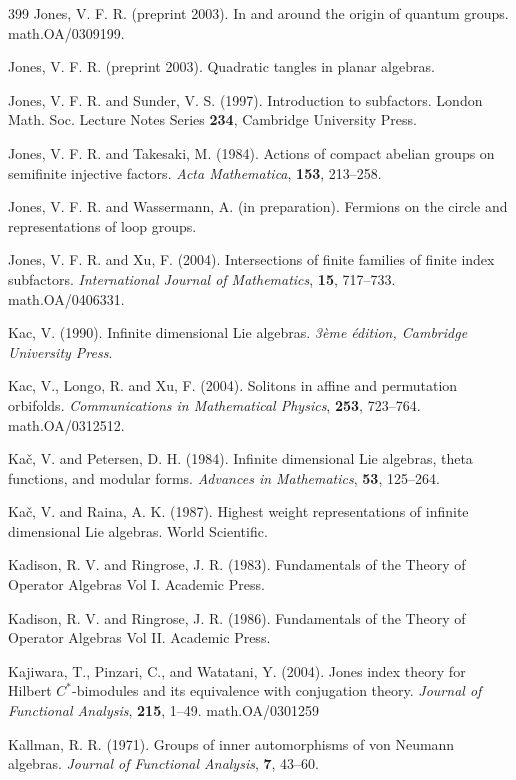 \documentclass[12pt]{article}
\theoremstyle{plain}
\theoremstyle{definition}
\numberwithin{equation}{section}
\begin{document}
\begin{thebibliography} {399}
Jones, V. F. R. (preprint 2003).
In and around the origin of quantum groups.
math.OA/0309199.

Jones, V. F. R. (preprint 2003).
Quadratic tangles in planar algebras.

Jones, V. F. R. and Sunder, V. S. (1997).
Introduction to subfactors.
London Math. Soc. Lecture Notes Series {\bf 234}, Cambridge
University Press.

Jones, V. F. R. and Takesaki, M. (1984).
Actions of compact abelian groups on semifinite 
injective factors.
{\em Acta Mathematica}, {\bf 153}, 213--258.

Jones, V. F. R. and Wassermann, A. (in preparation).
Fermions on the circle and representations of loop groups.

Jones, V. F. R. and Xu, F. (2004).
Intersections of finite families of finite index subfactors.
{\em International Journal of Mathematics}, {\bf 15}, 717--733.
math.OA/0406331.

Kac, V. (1990).
Infinite dimensional Lie algebras.
{\em 3\`eme \'edition, Cambridge University Press}.

Kac, V., Longo, R. and Xu, F. (2004).
Solitons in affine and permutation orbifolds.
{\em Communications in Mathematical Physics}, {\bf 253}, 723--764.
math.OA/0312512.

Ka\v c, V. and Petersen, D. H. (1984).
Infinite dimensional Lie algebras, theta functions, 
and modular forms.
{\em Advances in Mathematics}, {\bf 53}, 125--264.

Ka\v c, V. and Raina, A. K. (1987).
Highest weight representations of infinite dimensional Lie algebras.
World Scientific.

Kadison, R. V. and Ringrose, J. R. (1983).
Fundamentals of the Theory of Operator Algebras 
Vol I.  Academic Press.

Kadison, R. V. and Ringrose, J. R. (1986).
Fundamentals of the Theory of Operator Algebras 
Vol II. Academic Press.

Kajiwara, T., Pinzari, C., and Watatani, Y. (2004).
Jones index theory for Hilbert $C^*$-bimodules and 
its equivalence with conjugation theory.
{\em Journal of Functional Analysis}, {\bf 215}, 1--49.
math.OA/0301259  

Kallman, R. R. (1971).
Groups of inner automorphisms of von Neumann algebras.
{\em Journal of Functional Analysis}, {\bf 7},  43--60.


\end{thebibliography}
\end{document}

